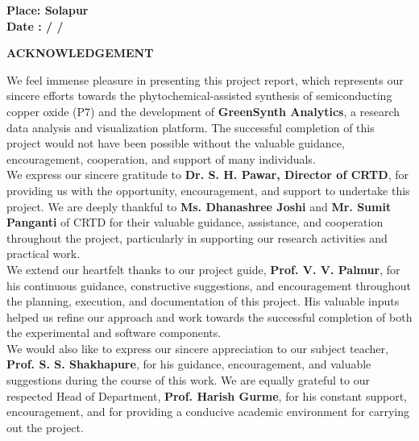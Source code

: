 \documentclass[12pt,a4paper,oneside]{report}
\begin{document}
{{{\vspace{2cm}
\begin{flushleft}
\textbf{Place: Solapur \\}
\vspace{0.2cm}
\textbf{Date : \hspace*{1cm}/ \hspace*{1cm}/}
\end{flushleft}



\newpage
\begin{center}
{\large{\textbf{ACKNOWLEDGEMENT}}}
\end{center}
\vspace{0.5cm}

We feel immense pleasure in presenting this project report, which represents our sincere efforts towards the phytochemical-assisted synthesis of semiconducting copper oxide (P7) and the development of \textbf{GreenSynth Analytics}, a research data analysis and visualization platform. The successful completion of this project would not have been possible without the valuable guidance, encouragement, cooperation, and support of many individuals.\\

We express our sincere gratitude to \textbf{Dr. S. H. Pawar, Director of CRTD}, for providing us with the opportunity, encouragement, and support to undertake this project. We are deeply thankful to \textbf{Ms. Dhanashree Joshi} and \textbf{Mr. Sumit Panganti} of CRTD for their valuable guidance, assistance, and cooperation throughout the project, particularly in supporting our research activities and practical work.\\

We extend our heartfelt thanks to our project guide, \textbf{Prof. V. V. Palmur}, for his continuous guidance, constructive suggestions, and encouragement throughout the planning, execution, and documentation of this project. His valuable inputs helped us refine our approach and work towards the successful completion of both the experimental and software components.\\

We would also like to express our sincere appreciation to our subject teacher, \textbf{Prof. S. S. Shakhapure}, for his guidance, encouragement, and valuable suggestions during the course of this work. We are equally grateful to our respected Head of Department, \textbf{Prof. Harish Gurme}, for his constant support, encouragement, and for providing a conducive academic environment for carrying out the project.\\

}}}
\end{document}
